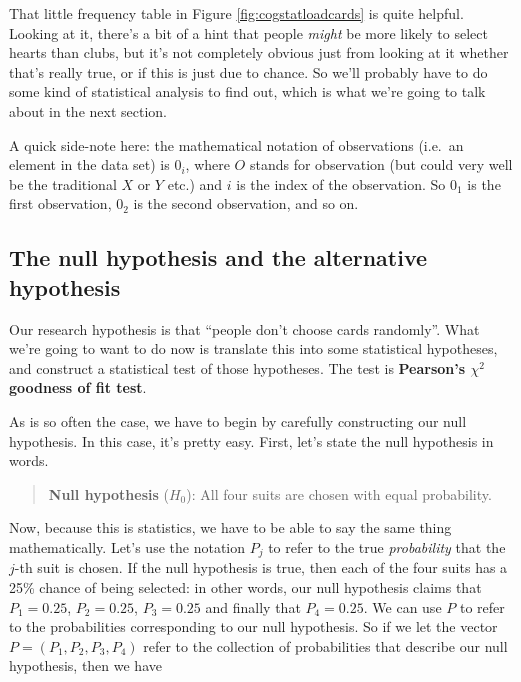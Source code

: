 \documentclass[
]{book}
\theoremstyle{definition}
\theoremstyle{definition}
\theoremstyle{definition}
\theoremstyle{definition}
\theoremstyle{remark}
\begin{document}
That little frequency table in Figure \ref{fig:cogstatloadcards} is quite helpful. Looking at it, there's a bit of a hint that people \emph{might} be more likely to select hearts than clubs, but it's not completely obvious just from looking at it whether that's really true, or if this is just due to chance. So we'll probably have to do some kind of statistical analysis to find out, which is what we're going to talk about in the next section.

A quick side-note here: the mathematical notation of observations (i.e.~an element in the data set) is \(0_i\), where \(O\) stands for observation (but could very well be the traditional \(X\) or \(Y\) etc.) and \(i\) is the index of the observation. So \(0_1\) is the first observation, \(0_2\) is the second observation, and so on.

\hypertarget{the-null-hypothesis-and-the-alternative-hypothesis}{%
\subsection{The null hypothesis and the alternative hypothesis}\label{the-null-hypothesis-and-the-alternative-hypothesis}}

Our research hypothesis is that ``people don't choose cards randomly''. What we're going to want to do now is translate this into some statistical hypotheses, and construct a statistical test of those hypotheses. The test is \textbf{Pearson's \(\chi^2\) goodness of fit test}.

As is so often the case, we have to begin by carefully constructing our null hypothesis. In this case, it's pretty easy. First, let's state the null hypothesis in words.

\begin{quote}
\textbf{Null hypothesis} (\(H_0\)): All four suits are chosen with equal probability.
\end{quote}

Now, because this is statistics, we have to be able to say the same thing mathematically. Let's use the notation \(P_j\) to refer to the true \emph{probability} that the \(j\)-th suit is chosen. If the null hypothesis is true, then each of the four suits has a 25\% chance of being selected: in other words, our null hypothesis claims that \(P_1 = 0.25\), \(P_2 = 0.25\), \(P_3 = 0.25\) and finally that \(P_4 = 0.25\). We can use \(P\) to refer to the probabilities corresponding to our null hypothesis. So if we let the vector \(P = (P_1, P_2, P_3, P_4)\) refer to the collection of probabilities that describe our null hypothesis, then we have
\end{document}
